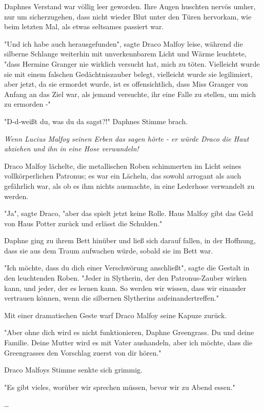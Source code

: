 {Daphnes Verstand war völlig leer geworden. Ihre Augen huschten nervös umher, nur um sicherzugehen, dass nicht wieder Blut unter den Türen hervorkam, wie beim letzten Mal, als etwas seltsames passiert war.

"Und ich habe auch herausgefunden", sagte Draco Malfoy leise, während die silberne Schlange weiterhin mit unverkennbarem Licht und Wärme leuchtete, "dass Hermine Granger nie wirklich versucht hat, mich zu töten. Vielleicht wurde sie mit einem falschen Gedächtniszauber belegt, vielleicht wurde sie legilimiert, aber jetzt, da sie ermordet wurde, ist es offensichtlich, dass Miss Granger von Anfang an das Ziel war, als jemand versuchte, ihr eine Falle zu stellen, um mich zu ermorden -"

"D-d-weißt du, was du da sagst?!" Daphnes Stimme brach.

\emph{Wenn Lucius Malfoy seinen Erben das sagen hörte - er würde Draco die Haut abziehen und ihn in eine Hose verwandeln!}

Draco Malfoy lächelte, die metallischen Roben schimmerten im Licht seines vollkörperlichen Patronus; es war ein Lächeln, das sowohl arrogant als auch gefährlich war, als ob es ihm nichts ausmachte, in eine Lederhose verwandelt zu werden.

"Ja", sagte Draco, "aber das spielt jetzt keine Rolle. Haus Malfoy gibt das Geld von Haus Potter zurück und erlässt die Schulden."

Daphne ging zu ihrem Bett hinüber und ließ sich darauf fallen, in der Hoffnung, dass sie aus dem Traum aufwachen würde, sobald sie im Bett war.

"Ich möchte, dass du dich einer Verschwörung anschließt", sagte die Gestalt in den leuchtenden Roben. "Jeder in Slytherin, der den Patronus-Zauber wirken kann, und jeder, der es lernen kann. So werden wir wissen, dass wir einander vertrauen können, wenn die silbernen Slytherins aufeinandertreffen."

Mit einer dramatischen Geste warf Draco Malfoy seine Kapuze zurück.

"Aber ohne dich wird es nicht funktionieren, Daphne Greengrass. Du und deine Familie. Deine Mutter wird es mit Vater aushandeln, aber ich möchte, dass die Greengrasses den Vorschlag zuerst von dir hören."

Draco Malfoys Stimme senkte sich grimmig.

"Es gibt vieles, worüber wir sprechen müssen, bevor wir zu Abend essen."

…

}
